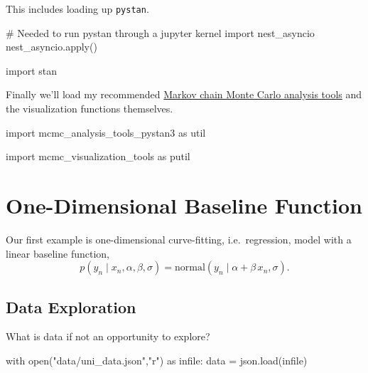 \documentclass[
  letterpaper,
  DIV=11,
  numbers=noendperiod]{scrartcl}
\newenvironment{Shaded}{\begin{snugshade}}{\end{snugshade}}
\newcommand{\BuiltInTok}[1]{\textcolor[rgb]{0.00,0.23,0.31}{#1}}
\newcommand{\CommentTok}[1]{\textcolor[rgb]{0.37,0.37,0.37}{#1}}
\newcommand{\ControlFlowTok}[1]{\textcolor[rgb]{0.00,0.23,0.31}{#1}}
\newcommand{\ImportTok}[1]{\textcolor[rgb]{0.00,0.46,0.62}{#1}}
\newcommand{\NormalTok}[1]{\textcolor[rgb]{0.00,0.23,0.31}{#1}}
\newcommand{\OperatorTok}[1]{\textcolor[rgb]{0.37,0.37,0.37}{#1}}
\newcommand{\StringTok}[1]{\textcolor[rgb]{0.13,0.47,0.30}{#1}}
\begin{document}
This includes loading up \texttt{pystan}.

\begin{Shaded}
\begin{Highlighting}[]
\CommentTok{\# Needed to run pystan through a jupyter kernel}
\ImportTok{import}\NormalTok{ nest\_asyncio}
\NormalTok{nest\_asyncio.}\BuiltInTok{apply}\NormalTok{()}

\ImportTok{import}\NormalTok{ stan}
\end{Highlighting}
\end{Shaded}

Finally we'll load my recommended
\href{https://github.com/betanalpha/mcmc_diagnostics}{Markov chain Monte
Carlo analysis tools} and the visualization functions themselves.

\begin{Shaded}
\begin{Highlighting}[]
\ImportTok{import}\NormalTok{ mcmc\_analysis\_tools\_pystan3 }\ImportTok{as}\NormalTok{ util}
\end{Highlighting}
\end{Shaded}

\begin{Shaded}
\begin{Highlighting}[]
\ImportTok{import}\NormalTok{ mcmc\_visualization\_tools }\ImportTok{as}\NormalTok{ putil}
\end{Highlighting}
\end{Shaded}

\section{One-Dimensional Baseline
Function}\label{one-dimensional-baseline-function}

Our first example is one-dimensional curve-fitting, i.e.~regression,
model with a linear baseline function, \[
p(y_{n} \mid x_{n}, \alpha, \beta, \sigma)
=
\text{normal}(y_{n} \mid \alpha + \beta \, x_{n}, \sigma).
\]

\subsection{Data Exploration}\label{data-exploration}

What is data if not an opportunity to explore?

\begin{Shaded}
\begin{Highlighting}[]
\ControlFlowTok{with} \BuiltInTok{open}\NormalTok{(}\StringTok{"data/uni\_data.json"}\NormalTok{,}\StringTok{"r"}\NormalTok{) }\ImportTok{as}\NormalTok{ infile:}
\NormalTok{  data }\OperatorTok{=}\NormalTok{ json.load(infile)}
\end{Highlighting}
\end{Shaded}
\end{document}
